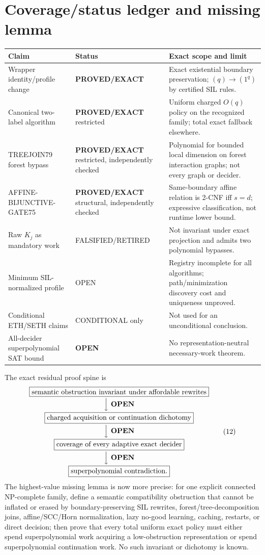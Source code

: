 \documentclass[11pt]{article}
\newcommand{\PROVED}{\textbf{PROVED/EXACT}}
\newcommand{\OPEN}{\textbf{OPEN}}
\begin{document}
\section{Coverage/status ledger and missing lemma}
\begin{longtable}{p{.19\linewidth}p{.19\linewidth}p{.51\linewidth}}
\toprule
Claim & Status & Exact scope and limit\\\midrule\endhead
Wrapper identity/profile change & \PROVED{} & Exact existential boundary preservation; $(q)\to(1^q)$ by certified SIL rules.\\
Canonical two-label algorithm & \PROVED{} restricted & Uniform charged $O(q)$ policy on the recognized family; total exact fallback elsewhere.\\
TREEJOIN79 forest bypass & \PROVED{} restricted, independently checked & Polynomial for bounded local dimension on forest interaction graphs; not every graph or decider.\\
AFFINE-BIJUNCTIVE-GATE75 & \PROVED{} structural, independently checked & Same-boundary affine relation is 2-CNF iff $s=d$; expressive classification, not runtime lower bound.\\
Raw $K_j$ as mandatory work & FALSIFIED/RETIRED & Not invariant under exact projection and admits two polynomial bypasses.\\
Minimum SIL-normalized profile & OPEN & Registry incomplete for all algorithms; path/minimization discovery cost and uniqueness unproved.\\
Conditional ETH/SETH claims & CONDITIONAL only & Not used for an unconditional conclusion.\\
All-decider superpolynomial SAT bound & \OPEN{} & No representation-neutral necessary-work theorem.\\
\bottomrule
\end{longtable}

The exact residual proof spine is
\[
\begin{gathered}
\boxed{\text{semantic obstruction invariant under affordable rewrites}}\\[-2pt]
\Big\downarrow\ {\OPEN}\\[-2pt]
\boxed{\text{charged acquisition or continuation dichotomy}}\\[-2pt]
\Big\downarrow\ {\OPEN}\\[-2pt]
\boxed{\text{coverage of every adaptive exact decider}}\\[-2pt]
\Big\downarrow\ {\OPEN}\\[-2pt]
\boxed{\text{superpolynomial contradiction}.}
\end{gathered}                                                       \tag{12}
\]
The highest-value missing lemma is now more precise: for one explicit
connected NP-complete family, define a semantic compatibility obstruction
that cannot be inflated or erased by boundary-preserving SIL rewrites,
forest/tree-decomposition joins, affine/SCC/Horn normalization, lazy no-good
learning, caching, restarts, or direct decision; then prove that every total
uniform exact policy must either spend superpolynomial work acquiring a
low-obstruction representation or spend superpolynomial continuation work.
No such invariant or dichotomy is known.
\end{document}
